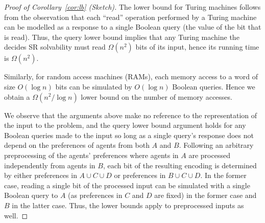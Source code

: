 \begin{proof}[Proof of Corollary~\ref{cor:lb} (Sketch)]
    The lower bound for Turing machines follows from the observation that each ``read'' operation performed by a Turing machine can be modelled as a response to a single Boolean query (the value of the bit that is read). Thus, the query lower bound implies that any Turing machine the decides SR solvability must read $\Omega(n^2)$ bits of its input, hence its running time is $\Omega(n^2)$. 
    
    Similarly, for random access machines (RAMs), each memory access to a word of size $O(\log n)$ bits can be simulated by $O(\log n)$ Boolean queries. Hence we obtain a $\Omega(n^2/\log n)$ lower bound on the number of memory accesses.

    We observe that the arguments above make no reference to the representation of the input to the problem, and the query lower bound argument holds for any Boolean queries made to the input so long as a single query's response does not depend on the preferences of agents from both $A$ and $B$. Following an arbitrary preprocessing of the agents' preferences where agents in $A$ are processed independently from agents in $B$, each bit of the resulting encoding is determined by either preferences in $A \cup C \cup D$ or preferences in $B \cup C \cup D$. In the former case, reading a single bit of the processed input can be simulated with a single Boolean query to $A$ (as preferences in $C$ and $D$ are fixed) in the former case and $B$ in the latter case. Thus, the lower bounds apply to preprocessed inputs as well.
\end{proof}







